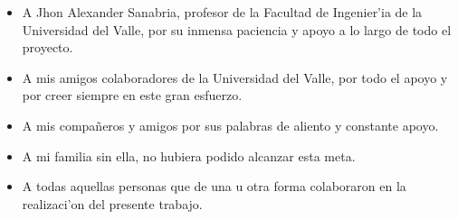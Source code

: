 
\begin{itemize}
\item A Jhon Alexander Sanabria, profesor de la Facultad de Ingenier'ia de la Universidad del Valle, por su inmensa paciencia y apoyo a lo largo de todo el proyecto.
\item A mis amigos colaboradores de la Universidad del Valle, por todo el apoyo y por creer siempre en este gran esfuerzo.
\item A mis compañeros y amigos por sus palabras de aliento y constante apoyo.
\item A mi familia sin ella, no hubiera podido alcanzar esta meta.
\item A todas aquellas personas que de una u otra forma colaboraron en la realizaci'on del presente trabajo.
\end{itemize}

